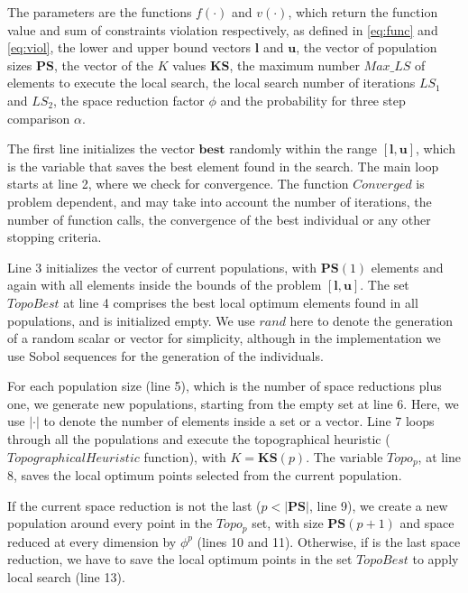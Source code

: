 The parameters are the functions $f(\cdot)$ and $v(\cdot)$, which return the function value and sum of constraints violation respectively, as defined in \ref{eq:func} and \ref{eq:viol}, the lower and upper bound vectors $\bm{l}$ and $\bm{u}$, the vector of population sizes $\bm{PS}$, the vector of the $K$ values $\bm{KS}$, the maximum number $Max\_LS$ of elements to execute the local search, the local search number of iterations $LS_1$ and $LS_2$, the space reduction factor $\phi$ and the probability for three step comparison $\alpha$.






The first line initializes the vector $\bm{best}$ randomly within the range $[\bm{l}, \bm{u}]$, which is the variable that saves the best element found in the search. The main loop starts at line 2, where we check for convergence. The function $Converged$ is problem dependent, and may take into account the number of iterations, the number of function calls, the convergence of the best individual or any other stopping criteria.

Line 3 initializes the vector of current populations, with $\bm{PS}(1)$ elements and again with all elements inside the bounds of the problem $[\bm{l}, \bm{u}]$. The set $TopoBest$ at line 4 comprises the best local optimum elements found in all populations, and is initialized empty. We use $rand$ here to denote the generation of a random scalar or vector for simplicity, although in the implementation we use Sobol sequences for the generation of the individuals.

For each population size (line 5), which is the number of space reductions plus one, we generate new populations, starting from the empty set at line 6. Here, we use $|\cdot|$ to denote the number of elements inside a set or a vector. Line 7 loops through all the populations and execute the topographical heuristic ($TopographicalHeuristic$ function), with $K = \bm{KS}(p)$. The variable $Topo_p$, at line 8, saves the local optimum points selected from the current population.

If the current space reduction is not the last ($p < |\bm{PS}|$, line 9), we create a new population around every point in the $Topo_p$ set, with size $\bm{PS}(p + 1)$ and space reduced at every dimension by $\phi^p$ (lines 10 and 11). Otherwise, if is the last space reduction, we have to save the local optimum points in the set $TopoBest$ to apply local search (line 13).


